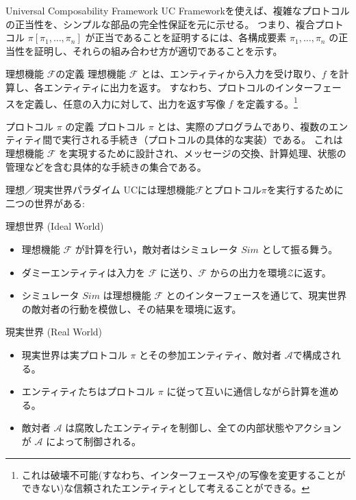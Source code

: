 \documentclass[aspectratio=169,10pt]{beamer}
\newenvironment{proofblock}[1][]
{\begin{block}{#1}\vspace{0.5em}}
{\vspace{0.5em}\end{block}}
\begin{document}
\begin{frame}{Universal Composability Framework}
UC Frameworkを使えば、複雑なプロトコルの正当性を、シンプルな部品の完全性保証を元に示せる。
つまり、複合プロトコル $\pi[\pi_1,\dots,\pi_n]$ が正当であることを証明するには、各構成要素 $\pi_1,\dots,\pi_n$ の正当性を証明し、それらの組み合わせ方が適切であることを示す。

  \begin{proofblock}[理想機能 $\mathcal{F}$の定義]
    理想機能 $\mathcal{F}$ とは、エンティティから入力を受け取り、$f$ を計算し、各エンティティに出力を返す。
    すなわち、プロトコルのインターフェースを定義し、任意の入力に対して、出力を返す写像 $f$ を定義する。\footnote{これは破壊不可能(すなわち、インターフェースや$f$の写像を変更することができない)な信頼されたエンティティとして考えることができる。}
  \end{proofblock}

  \begin{proofblock}[プロトコル $\pi$ の定義]
    プロトコル $\pi$ とは、実際のプログラムであり、複数のエンティティ間で実行される手続き（プロトコルの具体的な実装）である。
    これは理想機能 $\mathcal{F}$ を実現するために設計され、メッセージの交換、計算処理、状態の管理などを含む具体的な手続きの集合である。
  \end{proofblock}
\end{frame}

\begin{frame}{理想／現実世界パラダイム}
    UCには理想機能$\mathcal{F}$とプロトコル$\pi$を実行するために二つの世界がある:

    \begin{proofblock}[理想世界 (Ideal World)]
    \begin{itemize}
      \item 理想機能 $\mathcal{F}$ が計算を行い，敵対者はシミュレータ $Sim$ として振る舞う。
      \item ダミーエンティティは入力を $\mathcal{F}$ に送り、$\mathcal{F}$ からの出力を環境$\mathcal{Z}$に返す。
      \item シミュレータ $Sim$ は理想機能 $\mathcal{F}$ とのインターフェースを通じて、現実世界の敵対者の行動を模倣し、その結果を環境に返す。
    \end{itemize}
  \end{proofblock}


  \begin{proofblock}[現実世界 (Real World)]
    \begin{itemize}
      \item 現実世界は実プロトコル $\pi$ とその参加エンティティ、敵対者 $\mathcal{A}$で構成される。
      \item エンティティたちはプロトコル $\pi$ に従って互いに通信しながら計算を進める。
      \item 敵対者 $\mathcal{A}$ は腐敗したエンティティを制御し、全ての内部状態やアクションが $\mathcal{A}$ によって制御される。
    \end{itemize}
  \end{proofblock}
\end{frame}
\end{document}
